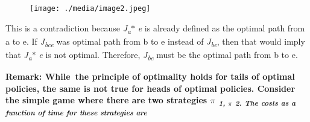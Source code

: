\documentclass[12pt,twoside]{article}
\begin{document}
\vspace{\baselineskip}

\vspace{\baselineskip}

\vspace{\baselineskip}



\begin{figure}[H]
	\begin{Center}
		\texttt{[image: ./media/image2.jpeg]}
	\end{Center}
\end{figure}



{\fontsize{10pt}{12.0pt}\selectfont \par}\par


\vspace{\baselineskip}

\vspace{\baselineskip}
\begin{adjustwidth}{0.08in}{0.58in}
This is a contradiction because \textit{J\textsubscript{a}}$\ast$ \textit{e }is already defined as the optimal path from a to e. If \textit{J\textsubscript{bce} }was optimal path from b to e instead of \textit{J\textsubscript{be}}, then that would imply that \textit{J\textsubscript{a}}$\ast$ \textit{e }is not optimal. Therefore, \textit{J\textsubscript{be} }must be the optimal path from b to e.\par

\end{adjustwidth}


\vspace{\baselineskip}

\vspace{\baselineskip}
\begin{adjustwidth}{0.58in}{0.08in}
{\fontsize{10pt}{12.0pt}\selectfont \textbf{Remark: While\ the principle of optimality holds for tails of optimal policies, the same is not true for  heads of optimal policies. Consider the simple game where there are two strategies \textit{$ \pi $ \textsubscript{1, $ \pi $ 2. The costs as a function of time for these strategies are}}}\par}\par

\end{adjustwidth}
\end{document}
